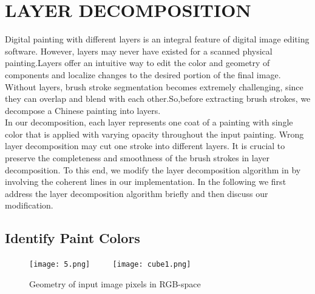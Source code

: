 \chapter{LAYER DECOMPOSITION}
Digital painting with different layers is an integral feature of digital image editing software. However, layers may never have existed for a scanned physical painting.Layers offer an intuitive way to edit the color and geometry of components and localize changes to the desired portion of the final image. Without layers, brush stroke segmentation becomes extremely challenging, since they can overlap and blend with each other.So,before extracting brush strokes, we decompose a Chinese painting into layers.\\
In our decomposition, each layer represents one coat of a painting with single color that is applied with varying opacity throughout the input painting. Wrong layer decomposition may cut one stroke into different layers. It is crucial to preserve the completeness and smoothness of the brush strokes in layer decomposition. To this end, we modify the layer decomposition algorithm in \cite{tan2016decomposing} by involving the coherent lines \cite{kang2007coherent} in our implementation. In the following we first address the layer decomposition algorithm \cite{tan2016decomposing} briefly and then discuss our modification. 


\section{Identify Paint Colors}

\begin{figure}[H]
	\centering
	\texttt{[image: 5.png]}
	~~~~
	\texttt{[image: cube1.png]}
	\caption{Geometry of input image pixels in RGB-space}
	\label{point cloud}
\end{figure}

